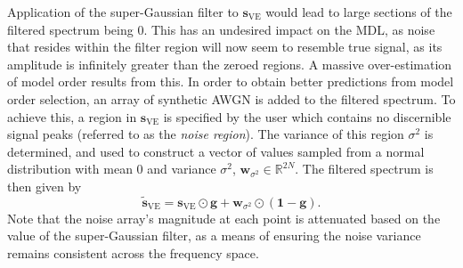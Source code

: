 Application of the
super-Gaussian filter to $\symbf{s}_{\text{VE}}$
would lead to large sections of the filtered spectrum being $0$. This has an
undesired impact on the \ac{MDL}, as noise that resides within the filter
region will now seem to resemble true signal,
as its amplitude is infinitely greater than the zeroed regions. A massive
over-estimation of model order results from this.
In order to obtain better predictions from model order selection, an array of
synthetic \ac{AWGN} is
added to the filtered spectrum. To achieve this, a region in
$\symbf{s}_{\text{VE}}$ is specified by the user which contains no discernible
signal peaks (referred to as the \emph{noise region}). The variance of this region
$\sigma^2$ is determined, and used to construct a vector of values sampled from
a normal distribution with mean $0$ and variance $\sigma^2$,
$\symbf{w}_{\sigma^2} \in \mathbb{R}^{2N}$.
The filtered spectrum is then given by
\begin{equation}
    \widetilde{\symbf{s}}_{\text{VE}} = \symbf{s}_{\text{VE}} \odot \symbf{g} + \symbf{w}_{\sigma^2} \odot \left(\symbf{1} - \symbf{g} \right).
    \label{eq:Sve-tilde}
\end{equation}
Note that the noise array's magnitude at each point is attenuated based on the
value of the super-Gaussian filter, as a means of ensuring the noise variance
remains consistent across the frequency space.

